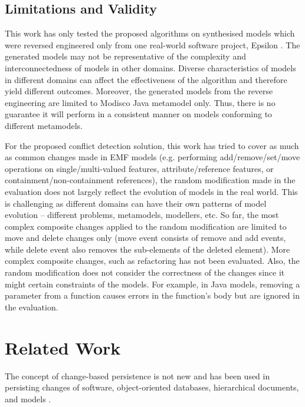 \subsection{Limitations and Validity}
\label{sec:limitation_and_Threat_to_validity}
This work has only tested the proposed algorithms on synthesised models which were reversed engineered only from one real-world software project, Epsilon \cite{eclipse2018epsilongit}. The generated models may not be representative of the complexity and interconnectedness of models in other domains. Diverse characteristics of models in different domains can affect the effectiveness of the algorithm and therefore yield different outcomes. Moreover, the generated models from the reverse engineering are limited to Modisco Java \cite{eclipse2018modiscojava} metamodel only. Thus, there is no guarantee it will perform in a consistent manner on models conforming to different metamodels.

For the proposed conflict detection solution, this work has tried to cover as much as common changes made in EMF models (e.g. performing \textsf{add}/\textsf{remove}/\textsf{set}/\textsf{move} operations on \textsf{single}/\textsf{multi}-\textsf{valued} features, \textsf{attribute}/\textsf{reference} features, or \textsf{containment}/\textsf{non}-\textsf{containment} references), the random modification made in the evaluation does not largely reflect the evolution of models in the real world. This is challenging as different domains can have their own patterns of model evolution -- different problems, metamodels, modellers, etc. So far, the most complex composite changes applied to the random modification are limited to \textsf{move} and \textsf{delete} changes only (\textsf{move} event consists of \textsf{remove} and {add} events, while \textsf{delete} event also removes the sub-elements of the deleted element). More complex composite changes, such as refactoring has not been evaluated. Also, the random modification does not consider the correctness of the changes since it might certain constraints of the models. For example, in Java \cite{eclipse2018modiscojava} models, removing a parameter from a function causes errors in the function's body but are ignored in the evaluation. 

\section{Related Work}
\label{sec:related_work}
The concept of change-based persistence is not new and has been used in persisting changes of software, object-oriented databases, hierarchical documents, and models 
\cite{DBLP:journals/entcs/RobbesL07,DBLP:conf/sde/LippeO92,DBLP:conf/caise/IgnatN05,koegel2010emfstore}. 

